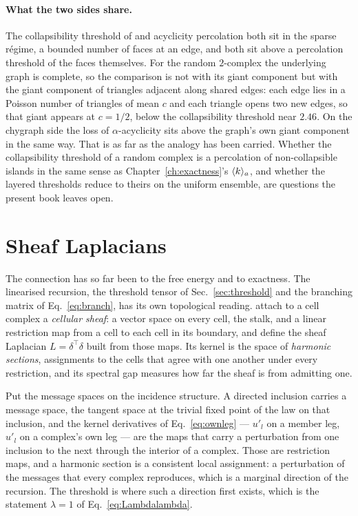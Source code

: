 \paragraph{What the two sides share.} The collapsibility threshold of
\citet{aronshtam2013} and acyclicity percolation both sit in the sparse
r\'egime, a bounded number of faces at an edge, and both sit above a
percolation threshold of the faces themselves. For the random $2$-complex
the underlying graph is complete, so the comparison is not with its giant
component but with the giant component of triangles adjacent along shared
edges: each edge lies in a Poisson number of triangles of mean $c$ and each
triangle opens two new edges, so that giant appears at $c=1/2$, below the
collapsibility threshold near $2.46$. On the chygraph side the loss of
$\alpha$-acyclicity sits above the graph's own giant component in the
same way. That is as far as the analogy has been carried. Whether the collapsibility threshold of a
random complex is a percolation of non-collapsible islands in the same sense
as Chapter~\ref{ch:exactness}'s $\langle k \rangle_{a}$, and whether the layered
thresholds reduce to theirs on the uniform ensemble, are questions the
present book leaves open.

\section{Sheaf Laplacians}
\label{sec:mb-sheaf}

The connection has so far been to the free energy and to exactness. The
linearised recursion, the threshold tensor of Sec.~\ref{sec:threshold} and
the branching matrix of Eq.~\eqref{eq:branch}, has its own topological
reading. \citet{hansen2019} attach to a cell complex a \emph{cellular sheaf}:
a vector space on every cell, the stalk, and a linear restriction map from a
cell to each cell in its boundary, and define the sheaf Laplacian
$L=\delta^{\top}\delta$ built from those maps. Its kernel is the space of
\emph{harmonic sections}, assignments to the cells that agree with one
another under every restriction, and its spectral gap measures how far the
sheaf is from admitting one.

Put the message spaces on the incidence structure. A directed inclusion
carries a message space, the tangent space at the trivial fixed point of the
law on that inclusion, and the kernel derivatives of Eq.~\eqref{eq:ownleg}
--- $u'_{l}$ on a member leg, $\hat u'_{l}$ on a complex's own leg --- are
the maps that carry a perturbation from one inclusion to the next through
the interior of a complex. Those are restriction maps, and a harmonic
section is a consistent local assignment: a perturbation of the messages
that every complex reproduces, which is a marginal direction of the
recursion. The threshold is where such a direction first exists, which is
the statement $\lambda=1$ of Eq.~\eqref{eq:Lambdalambda}.

